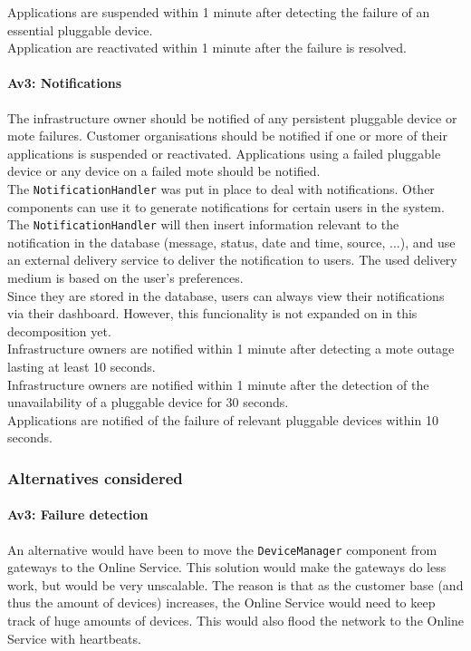         Applications are suspended within 1 minute after detecting
        the failure of an essential pluggable device. \\
        Application are reactivated within 1 minute after the failure is resolved.

    \paragraph{Av3: Notifications}
        The infrastructure owner should be notified of any persistent
        pluggable device or mote failures. Customer organisations should be
        notified if one or more of their applications is suspended or
        reactivated. Applications using a failed pluggable device or any device
        on a failed mote should be notified. \\
        The \texttt{NotificationHandler} was put in place to deal with
        notifications. Other components can use it to generate notifications for
        certain users in the system. The \texttt{NotificationHandler} will then
        insert information relevant to the notification in the database (message,
        status, date and time, source, ...), and use an external delivery
        service to deliver the notification to users. The used delivery medium
        is based on the user's preferences. \\
        Since they are stored in the database, users can always view
        their notifications via their dashboard. However, this funcionality is not
        expanded on in this decomposition yet. \\

        Infrastructure owners are notified within 1 minute after detecting a mote outage lasting at
        least 10 seconds. \\
        Infrastructure owners are notified within 1 minute after the detection of the unavailability of
        a pluggable device for 30 seconds. \\
        Applications are notified of the failure of relevant pluggable devices within 10 seconds.

    \subsubsection{Alternatives considered}
        \paragraph{Av3: Failure detection}
            An alternative would have been to move the \texttt{DeviceManager}
            component from gateways to the Online Service. This solution would make the
            gateways do less work, but would be very unscalable. The reason is
            that as the customer base (and thus the amount of devices) increases,
            the Online Service would need to keep track of huge amounts of devices.
            This would also flood the network to the Online Service with heartbeats.

